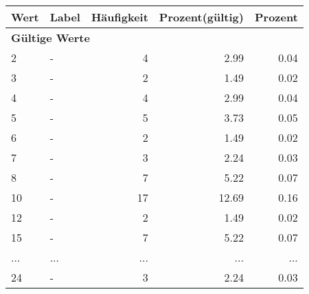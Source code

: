      \begin{longtable}{lXrrr}
     \toprule
     \textbf{Wert} & \textbf{Label} & \textbf{Häufigkeit} & \textbf{Prozent(gültig)} & \textbf{Prozent} \\
     \endhead
     \midrule
     \multicolumn{5}{l}{\textbf{Gültige Werte}}\\
        2 & \multicolumn{1}{X}{-} & %
          \num{4} &
          \num[round-mode=places,round-precision=2]{2,99} &
          \num[round-mode=places,round-precision=2]{0,04} \\
        3 & \multicolumn{1}{X}{-} & %
          \num{2} &
          \num[round-mode=places,round-precision=2]{1,49} &
          \num[round-mode=places,round-precision=2]{0,02} \\
        4 & \multicolumn{1}{X}{-} & %
          \num{4} &
          \num[round-mode=places,round-precision=2]{2,99} &
          \num[round-mode=places,round-precision=2]{0,04} \\
        5 & \multicolumn{1}{X}{-} & %
          \num{5} &
          \num[round-mode=places,round-precision=2]{3,73} &
          \num[round-mode=places,round-precision=2]{0,05} \\
        6 & \multicolumn{1}{X}{-} & %
          \num{2} &
          \num[round-mode=places,round-precision=2]{1,49} &
          \num[round-mode=places,round-precision=2]{0,02} \\
        7 & \multicolumn{1}{X}{-} & %
          \num{3} &
          \num[round-mode=places,round-precision=2]{2,24} &
          \num[round-mode=places,round-precision=2]{0,03} \\
        8 & \multicolumn{1}{X}{-} & %
          \num{7} &
          \num[round-mode=places,round-precision=2]{5,22} &
          \num[round-mode=places,round-precision=2]{0,07} \\
        10 & \multicolumn{1}{X}{-} & %
          \num{17} &
          \num[round-mode=places,round-precision=2]{12,69} &
          \num[round-mode=places,round-precision=2]{0,16} \\
        12 & \multicolumn{1}{X}{-} & %
          \num{2} &
          \num[round-mode=places,round-precision=2]{1,49} &
          \num[round-mode=places,round-precision=2]{0,02} \\
        15 & \multicolumn{1}{X}{-} & %
          \num{7} &
          \num[round-mode=places,round-precision=2]{5,22} &
          \num[round-mode=places,round-precision=2]{0,07} \\
       ... & ... & ... & ... & ... \\
        24 & \multicolumn{1}{X}{-} & %
          \num{3} &
          \num[round-mode=places,round-precision=2]{2,24} &
          \num[round-mode=places,round-precision=2]{0,03} \\


\end{longtable}
